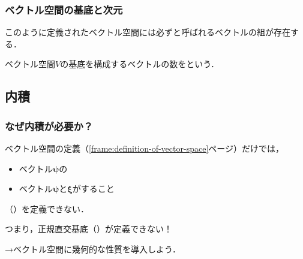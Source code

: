 \documentclass[
    10pt,
    ]{sotsu-beamer}
\begin{document}
\begin{frame}
    \frametitle{ベクトル空間の基底と次元}

    このように定義されたベクトル空間には必ずと呼ばれるベクトルの組が存在する．
    
    ベクトル空間$V$の基底を構成するベクトルの数をという．

\end{frame}


\subsection{内積}

\begin{frame}
    \frametitle{なぜ内積が必要か？}

    ベクトル空間の定義（\ref{frame:definition-of-vector-space}ページ）だけでは，
    \begin{itemize}
        \item ベクトル$\symbf{\psi}$の
        \item ベクトル$\symbf{\psi}$と$\symbf{\xi}$がすること
    \end{itemize}
    （）を定義できない．

    \pause

    つまり，\alert{正規直交基底（）が定義できない！}

    →ベクトル空間に幾何的な性質を導入しよう．


\end{frame}
\end{document}
